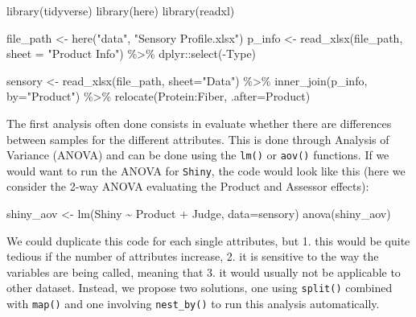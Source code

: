 \documentclass[
]{book}
\newenvironment{Shaded}{\begin{snugshade}}{\end{snugshade}}
\newcommand{\AttributeTok}[1]{\textcolor[rgb]{0.77,0.63,0.00}{#1}}
\newcommand{\FunctionTok}[1]{\textcolor[rgb]{0.00,0.00,0.00}{#1}}
\newcommand{\NormalTok}[1]{#1}
\newcommand{\OtherTok}[1]{\textcolor[rgb]{0.56,0.35,0.01}{#1}}
\newcommand{\SpecialCharTok}[1]{\textcolor[rgb]{0.00,0.00,0.00}{#1}}
\newcommand{\StringTok}[1]{\textcolor[rgb]{0.31,0.60,0.02}{#1}}
\begin{document}
\begin{Shaded}
\begin{Highlighting}[]
\FunctionTok{library}\NormalTok{(tidyverse)}
\FunctionTok{library}\NormalTok{(here)}
\FunctionTok{library}\NormalTok{(readxl)}

\NormalTok{file\_path }\OtherTok{\textless{}{-}} \FunctionTok{here}\NormalTok{(}\StringTok{"data"}\NormalTok{, }\StringTok{"Sensory Profile.xlsx"}\NormalTok{) }
\NormalTok{p\_info }\OtherTok{\textless{}{-}} \FunctionTok{read\_xlsx}\NormalTok{(file\_path, }\AttributeTok{sheet =} \StringTok{"Product Info"}\NormalTok{) }\SpecialCharTok{\%\textgreater{}\%} 
\NormalTok{  dplyr}\SpecialCharTok{::}\FunctionTok{select}\NormalTok{(}\SpecialCharTok{{-}}\NormalTok{Type)}

\NormalTok{sensory }\OtherTok{\textless{}{-}} \FunctionTok{read\_xlsx}\NormalTok{(file\_path, }\AttributeTok{sheet=}\StringTok{"Data"}\NormalTok{) }\SpecialCharTok{\%\textgreater{}\%} 
  \FunctionTok{inner\_join}\NormalTok{(p\_info, }\AttributeTok{by=}\StringTok{"Product"}\NormalTok{) }\SpecialCharTok{\%\textgreater{}\%} 
  \FunctionTok{relocate}\NormalTok{(Protein}\SpecialCharTok{:}\NormalTok{Fiber, }\AttributeTok{.after=}\NormalTok{Product)}
\end{Highlighting}
\end{Shaded}

The first analysis often done consists in evaluate whether there are differences between samples for the different attributes. This is done through Analysis of Variance (ANOVA) and can be done using the \texttt{lm()} or \texttt{aov()} functions.
If we would want to run the ANOVA for \texttt{Shiny}, the code would look like this (here we consider the 2-way ANOVA evaluating the Product and Assessor effects):

\begin{Shaded}
\begin{Highlighting}[]
\NormalTok{shiny\_aov }\OtherTok{\textless{}{-}} \FunctionTok{lm}\NormalTok{(Shiny }\SpecialCharTok{\textasciitilde{}}\NormalTok{ Product }\SpecialCharTok{+}\NormalTok{ Judge, }\AttributeTok{data=}\NormalTok{sensory)}
\FunctionTok{anova}\NormalTok{(shiny\_aov)}
\end{Highlighting}
\end{Shaded}

We could duplicate this code for each single attributes, but 1. this would be quite tedious if the number of attributes increase, 2. it is sensitive to the way the variables are being called, meaning that 3. it would usually not be applicable to other dataset. Instead, we propose two solutions, one using \texttt{split()} combined with \texttt{map()} and one involving \texttt{nest\_by()} to run this analysis automatically.
\end{document}
